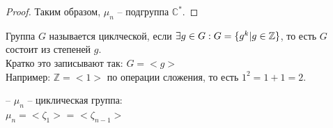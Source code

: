 \begin{normalsize}
\begin{proof}
    Таким образом, $\mu_n$ – подгруппа $\mathbb{C}^*$.
  \end{proof}

  \begin{conj}
    Группа $G$ называется циклческой, если $\exists g\in G: \\ 
    G=\{ g^k | g\in\mathbb{Z} \}$, то есть $G$ состоит из степеней $g$. \\
    Кратко это записывают так:
    $G=<g>$ \\
    Например: $\mathbb{Z}=<1>$ по операции сложения, то есть $1^2 = 1+1 =2$.

  \end{conj}

  \notice – $\mu_n$ – циклическая группа: \\
  $\mu_n = <\zeta_1>$ = $<\zeta_{n-1}>$

\end{normalsize}
